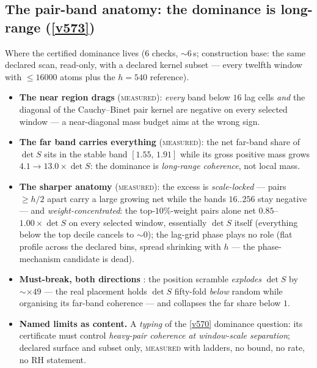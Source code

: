 \documentclass[11pt,a4paper]{article}
\begin{document}
\subsection{The pair-band anatomy: the dominance is long-range (\texorpdfstring{\vref{v573}}{v573})}\label{sec:v573}
Where the certified dominance lives
 ($6$ checks, ${\sim}6$\,s;
construction base: the same declared scan, read-only, with a declared
kernel subset --- every twelfth window with $\le16000$ atoms plus the
$h=540$ reference).

\begin{itemize}[leftmargin=1.5em]
\item \textbf{The near region drags} (\textsc{measured}): \emph{every}
band below $16$ lag cells \emph{and} the diagonal of the Cauchy--Binet
pair kernel are negative on every selected window --- a near-diagonal
mass budget aims at the wrong sign.
\item \textbf{The far band carries everything} (\textsc{measured}): the
net far-band share of $\det S$ sits in the stable band $[1.55,\,1.91]$
while its gross positive mass grows $4.1\to13.0\times\det S$: the
dominance is \emph{long-range coherence}, not local mass.
\item \textbf{The sharper anatomy} (\textsc{measured}): the excess is
\emph{scale-locked} --- pairs $\ge h/2$ apart carry a large growing net
while the bands $16..256$ stay negative --- and \emph{weight-concentrated}:
the top-$10\%$-weight pairs alone net $0.85$--$1.00\times\det S$ on every
selected window, essentially $\det S$ itself (everything below the top
decile cancels to ${\sim}0$); the lag-grid phase plays no role (flat
profile across the declared bins, spread shrinking with $h$ --- the
phase-mechanism candidate is dead).
\item \textbf{Must-break, both directions} \mE: the position scramble
\emph{explodes} $\det S$ by ${\sim}\times49$ --- the real placement holds
$\det S$ fifty-fold \emph{below} random while organising its far-band
coherence --- and collapses the far share below $1$.
\item \textbf{Named limits as content.} A \emph{typing} of the \vref{v570}
dominance question: its certificate must control \emph{heavy-pair
coherence at window-scale separation}; declared surface and subset only,
\textsc{measured} with ladders, no bound, no rate, no RH statement.
\end{itemize}

\end{document}
